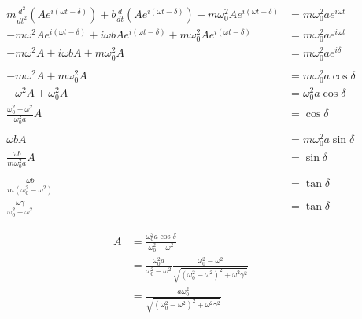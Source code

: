 \documentclass{article}
\begin{document}
\begin{enumerate}
        \begin{align*}
          m \frac{d^2}{d t^2} (A e^{i (\omega t - \delta)}) + b \frac{d}{d t} (A e^{i (\omega t - \delta)}) + m \omega_0^2 A e^{i (\omega t - \delta)} & = m \omega_0^2 a e^{i \omega t} \\
          -m \omega^2 A e^{i (\omega t - \delta)} + i \omega b A e^{i (\omega t - \delta)} + m \omega_0^2 A e^{i (\omega t - \delta)}                  & = m \omega_0^2 a e^{i \omega t} \\
          -m \omega^2 A + i \omega b A + m \omega_0^2 A                                                                                                & = m \omega_0^2 a e^{i \delta}   \\ \\
          -m \omega^2 A + m \omega_0^2 A                                                                                                               & = m \omega_0^2 a \cos \delta    \\
          -\omega^2 A + \omega_0^2 A                                                                                                                   & = \omega_0^2 a \cos \delta      \\
          \frac{\omega_0^2 - \omega^2}{\omega_0^2 a} A                                                                                                 & = \cos \delta                   \\ \\
          \omega b A                                                                                                                                   & = m \omega_0^2 a \sin \delta    \\
          \frac{\omega b}{m \omega_0^2 a} A                                                                                                            & = \sin \delta                   \\ \\
          \frac{\omega b}{m (\omega_0^2 - \omega^2)}                                                                                                   & = \tan \delta                   \\
          \frac{\omega \gamma}{\omega_0^2 - \omega^2}                                                                                                  & = \tan \delta
        \end{align*}

        \begin{align*}
          A & = \frac{\omega_0^2 a \cos \delta}{\omega_0^2 - \omega^2}                                                                        \\
            & = \frac{\omega_0^2 a}{\omega_0^2 - \omega^2} \frac{\omega_0^2 - \omega^2}{\sqrt{(\omega_0^2 - \omega^2)^2 + \omega^2 \gamma^2}} \\
            & = \frac{a \omega_0^2}{\sqrt{(\omega_0^2 - \omega^2)^2 + \omega^2 \gamma^2}}
        \end{align*}
\end{enumerate}
\end{document}
